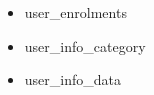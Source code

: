 \documentclass[a4paper, 14pt]{extarticle}
\begin{document}
\begin{itemize}
\begin{itemize}
      \item user\_enrolments
      \item user\_info\_category
      \item user\_info\_data

\end{itemize}
\end{itemize}
\end{document}
